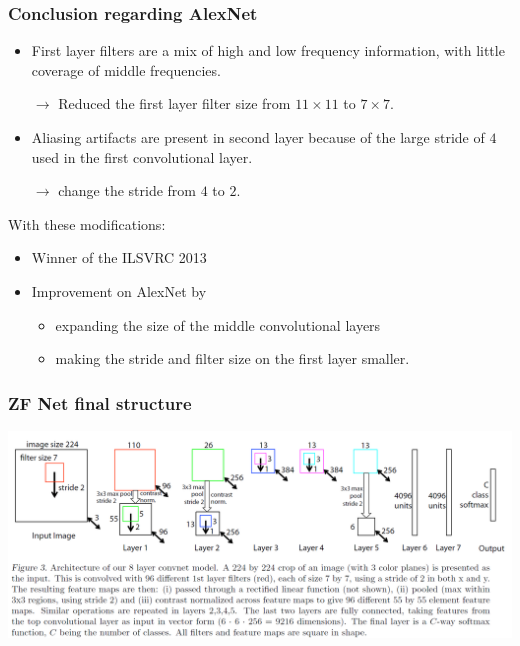 \begin{frame}
	\frametitle{Conclusion regarding AlexNet}

	\begin{itemize}
		\item First layer filters are a mix of high and low frequency information, with little coverage of middle frequencies.

		\smallskip
		$\rightarrow$ Reduced the first layer filter size from $11 \times 11$ to $7 \times 7$.

		\medskip

		\item Aliasing artifacts are present in second layer because of the large stride of $4$ used in the first convolutional layer.

		\smallskip
		$\rightarrow$ change the stride from $4$ to $2$.
	\end{itemize}

\bigskip

With these modifications:
\begin{itemize}
	\item Winner of the ILSVRC 2013
	\item Improvement on AlexNet by
	\begin{itemize}
		\item expanding the size of the middle convolutional layers
		\item making the stride and filter size on the first layer smaller.
	\end{itemize}
\end{itemize}


\end{frame}



\begin{frame}
	\frametitle{ZF Net final structure}
	\begin{center}
		\includegraphics[scale=0.5]{figs/ZFNet_structure}
	\end{center}

\end{frame}

